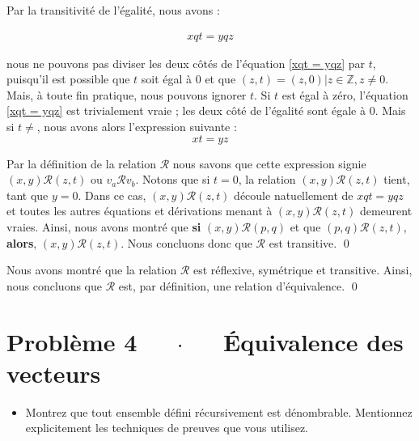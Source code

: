 \documentclass[16pt]{report}
\begin{document}
\begin{multicols*}{2}
\begin{Preuve}{}{}
                 Par la transitivité de l'égalité, nous avons : 

                 \begin{align}
                     xqt = yqz \label{xqt = yqz}  
                 \end{align}

                 nous ne pouvons pas diviser les deux côtés de l'équation \eqref{xqt = yqz} par $t$, puisqu'il 
                 est possible que $t$ soit égal à $0$ et que $(z, t) = (z, 0) | z \in \mathbb{Z}, z \neq 0 $. 
                 Mais, à toute fin pratique, nous pouvons ignorer $t$. Si $t$ est égal à zéro, 
                 l'équation \eqref{xqt = yqz} est trivialement vraie ; les deux côté de l'égalité sont égale 
                 à 0. Mais si $t \neq$, nous avons alors l'expression suivante : 
                 \[ xt = yz\]

                 Par la définition de la relation $\mathcal{R}$ nous savons que cette expression signie 
                 $(x, y)\mathcal{R}(z, t)$ ou $v_a\mathcal{R}v_b$. Notons que si $t = 0$, la relation 
                 $(x, y)\mathcal{R}(z, t)$ tient, tant que $y = 0$. Dans ce cas, $(x, y)\mathcal{R}(z, t)$ 
                 découle natuellement de $xqt = yqz$ et toutes les autres équations et dérivations 
                 menant à $(x, y)\mathcal{R}(z, t)$ demeurent vraies. Ainsi, nous avons montré que 
                 \textbf{si}   $(x, y) \mathcal{R}(p, q)$ et que  $(p, q)\mathcal{R}(z, t)$, \textbf{alors}, 
                 $(x, y)\mathcal{R}(z, t)$. Nous concluons donc que $\mathcal{R}$ est transitive. \qed

            \end{Preuve}

            \begin{Reponse*}{}{}
                Nous avons montré que la relation $\mathcal{R}$ est réflexive, symétrique et transitive. 
                Ainsi, nous concluons que $\mathcal{R}$ est, par définition, une relation d'équivalence. \qed 
            \end{Reponse*}



            \section*{Problème 4 $\quad$ $\cdot$  $\quad$ Équivalence des vecteurs}

            \begin{itemize}
                \item Montrez que tout ensemble défini récursivement est dénombrable. Mentionnez explicitement 
                    les techniques de preuves que vous utilisez. 
            \end{itemize}


\end{multicols*}
\end{document}
